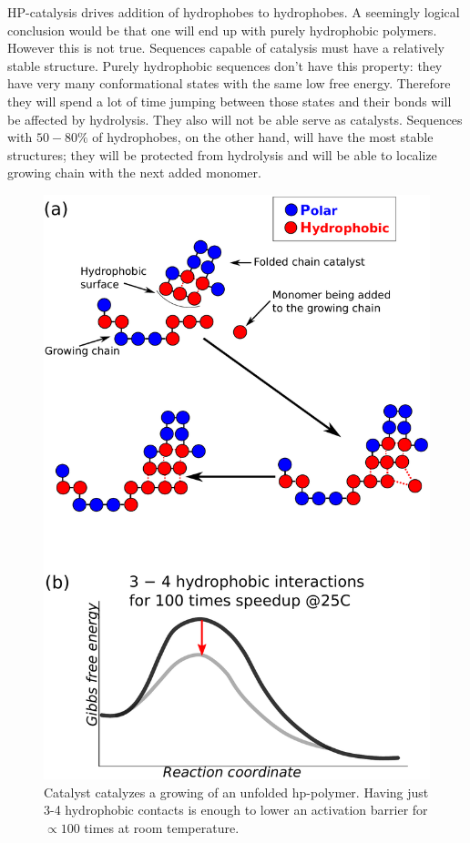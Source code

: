 \documentclass[twoside,twocolumn,9pt]{article}
\begin{document}
HP-catalysis drives addition of hydrophobes to hydrophobes. A seemingly logical conclusion would 
be that one will end up with purely hydrophobic polymers. However this is not true. Sequences 
capable of catalysis must have a relatively stable structure. Purely hydrophobic sequences don't 
have this property: they have very many conformational states with the same low free energy. 
Therefore they will spend a lot of time jumping between those states and their bonds will be 
affected by hydrolysis. They also will not be able serve as catalysts. Sequences with $50-80\%$ 
of hydrophobes, on the other hand, will have the most stable structures; they will 
be protected from hydrolysis and will be able to localize growing chain with the next added 
monomer.
\begin{figure}[h!]
  \centering
  \includegraphics[width=0.9\columnwidth]{pictures/hp-catalysis.pdf} 
  \caption{Catalyst catalyzes a growing of an unfolded hp-polymer. 
           Having just 3-4 hydrophobic contacts is enough to lower an 
           activation barrier for $\propto 100$ times at room 
           temperature.}
  \label{fig:hp-catalysis}
\end{figure}
\end{document}
